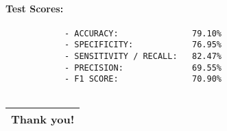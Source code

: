 \documentclass[11pt]{article}
\makeatletter
\newcommand{\boxspacing}{\kern\kvtcb@left@rule\kern\kvtcb@boxsep}
\newcommand{\prompt}[4]{
        \ttfamily\llap{{\color{#2}[#3]:\hspace{3pt}#4}}\vspace{-\baselineskip}
    }
\makeatother
\begin{document}
\hypertarget{test-scores}{%
\paragraph{Test Scores:}\label{test-scores}}

\begin{verbatim}
            - ACCURACY:               79.10%
            - SPECIFICITY:            76.95%
            - SENSITIVITY / RECALL:   82.47%
            - PRECISION:              69.55%
            - F1 SCORE:               70.90%
            
\end{verbatim}

\begin{longtable}[]{@{}r@{}}
\toprule
\endhead
\begin{minipage}[t]{0.97\columnwidth}\raggedleft
Thank you!\strut
\end{minipage}\tabularnewline
\bottomrule
\end{longtable}

    \begin{tcolorbox}[breakable, size=fbox, boxrule=1pt, pad at break*=1mm,colback=cellbackground, colframe=cellborder]
\prompt{In}{incolor}{ }{\boxspacing}
\begin{Verbatim}[commandchars=\\\{\}]

\end{Verbatim}
\end{tcolorbox}


    
    
    
\end{document}
